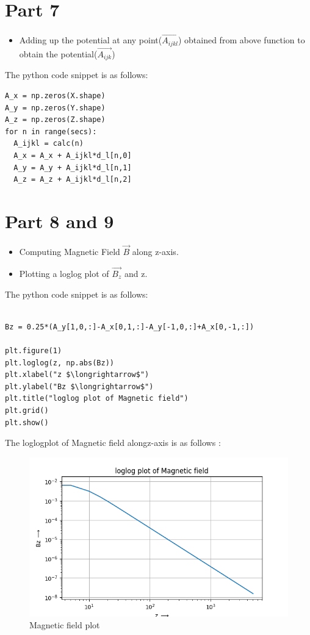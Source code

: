 \documentclass[11pt, a4paper]{article}
\begin{document}
\section*{Part 7}
\begin{itemize}
\item Adding up the potential at any point($\vec{A_{ijkl}}$) obtained from above function to obtain the potential($\vec{A_{ijk}}$)
\end{itemize}
The python code snippet is as follows:
\begin{verbatim}	
A_x = np.zeros(X.shape)
A_y = np.zeros(Y.shape)
A_z = np.zeros(Z.shape)
for n in range(secs): 
  A_ijkl = calc(n)
  A_x = A_x + A_ijkl*d_l[n,0]
  A_y = A_y + A_ijkl*d_l[n,1]
  A_z = A_z + A_ijkl*d_l[n,2]
\end{verbatim}

\section*{Part 8 and 9} 
\begin{itemize}
\item Computing Magnetic Field $\vec{B}$ along z-axis.
\item Plotting a loglog plot of $\vec{B_z}$ and z.
\end{itemize}
The python code snippet is as follows:
\begin{verbatim}	

Bz = 0.25*(A_y[1,0,:]-A_x[0,1,:]-A_y[-1,0,:]+A_x[0,-1,:])

plt.figure(1)
plt.loglog(z, np.abs(Bz))
plt.xlabel("z $\longrightarrow$")
plt.ylabel("Bz $\longrightarrow$")
plt.title("loglog plot of Magnetic field")
plt.grid()
plt.show()
\end{verbatim}

The loglogplot of Magnetic field alongz-axis is as follows :
	\begin{figure}[!tbh]
   	\centering
   	\includegraphics[scale=0.9]{Figure_1.png}   
   	\caption{Magnetic field plot}
   	\label{fig:sample}
   \end{figure} 
   
\end{document}
